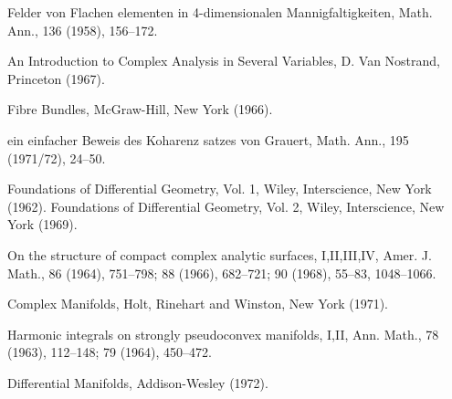 \begin{sourcebibliography}
 Felder von Flachen elementen in 4-dimensionalen Mannigfaltigkeiten, Math. Ann., 136 (1958), 156--172.
\end{sourcebibliography}
\begin{sourcebibliography}
 An Introduction to Complex Analysis in Several Variables, D. Van Nostrand, Princeton (1967).
\end{sourcebibliography}
\begin{sourcebibliography}
 Fibre Bundles, McGraw-Hill, New York (1966).
\end{sourcebibliography}
\begin{sourcebibliography}
 ein einfacher Beweis des Koharenz satzes von Grauert, Math. Ann., 195 (1971/72), 24--50.
\end{sourcebibliography}
\begin{sourcebibliography}
 Foundations of Differential Geometry, Vol. 1, Wiley, Interscience, New York (1962).
 Foundations of Differential Geometry, Vol. 2, Wiley, Interscience, New York (1969).
\end{sourcebibliography}
\begin{sourcebibliography}
 On the structure of compact complex analytic surfaces, I,II,III,IV, Amer. J. Math., 86 (1964), 751--798; 88 (1966), 682--721; 90 (1968), 55--83, 1048--1066.
\end{sourcebibliography}
\begin{sourcebibliography}
 Complex Manifolds, Holt, Rinehart and Winston, New York (1971).
\end{sourcebibliography}
\begin{sourcebibliography}
 Harmonic integrals on strongly pseudoconvex manifolds, I,II, Ann. Math., 78 (1963), 112--148; 79 (1964), 450--472.
\end{sourcebibliography}
\begin{sourcebibliography}
 Differential Manifolds, Addison-Wesley (1972).
\end{sourcebibliography}
